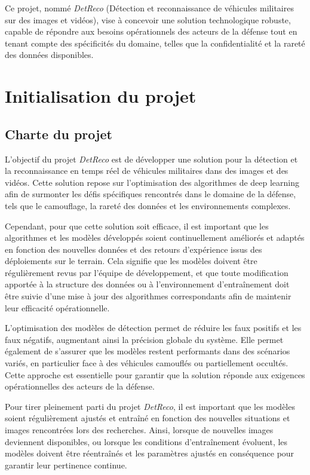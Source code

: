 Ce projet, nommé \textit{DetReco} (Détection et reconnaissance de véhicules militaires sur des images et vidéos), vise à concevoir une solution technologique robuste, capable de répondre aux besoins opérationnels des acteurs de la défense tout en tenant compte des spécificités du domaine, telles que la confidentialité et la rareté des données disponibles.


\section{Initialisation du projet}
\subsection{Charte du projet}

L’objectif du projet \textit{DetReco} est de développer une solution pour la détection et la reconnaissance en temps réel de véhicules militaires dans des images et des vidéos.
Cette solution repose sur l'optimisation des algorithmes de deep learning afin de surmonter les défis spécifiques rencontrés dans le domaine de la défense, tels que le camouflage, la rareté des données et les environnements complexes.

Cependant, pour que cette solution soit efficace, il est important que les algorithmes et les modèles développés soient continuellement améliorés et adaptés en fonction des nouvelles données et des retours d'expérience issus des déploiements sur le terrain.
Cela signifie que les modèles doivent être régulièrement revus par l'équipe de développement, et que toute modification apportée à la structure des données ou à l'environnement d'entraînement doit être suivie d'une mise à jour des algorithmes correspondants afin de maintenir leur efficacité opérationnelle.

L’optimisation des modèles de détection permet de réduire les faux positifs et les faux négatifs, augmentant ainsi la précision globale du système.
Elle permet également de s'assurer que les modèles restent performants dans des scénarios variés, en particulier face à des véhicules camouflés ou partiellement occultés.
Cette approche est essentielle pour garantir que la solution réponde aux exigences opérationnelles des acteurs de la défense.

Pour tirer pleinement parti du projet \textit{DetReco}, il est important que les modèles soient régulièrement ajustés et entraîné en fonction des nouvelles situations et images rencontrées lors des recherches.
Ainsi, lorsque de nouvelles images deviennent disponibles, ou lorsque les conditions d'entraînement évoluent, les modèles doivent être réentraînés et les paramètres ajustés en conséquence pour garantir leur pertinence continue.



